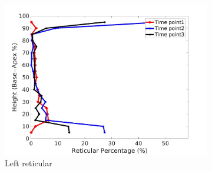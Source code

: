 \begin{figure}[H]
\begin{subfigure}{.42\linewidth}
  \includegraphics[width=\linewidth,trim={{.0\wd0} {.0\wd0} {.0\wd0} {.0\wd0}},clip]{QuantitativeAnalysis/Image/IPF21LeftLungReticularDiseaseAgainstHeight.jpg} %
  \caption{Left reticular}
  \label{fig:IPF21DiseaseAgainstHeightMain-c} 
\end{subfigure} 
\begin{subfigure}{.42\linewidth}%

\end{subfigure}
\end{figure}
